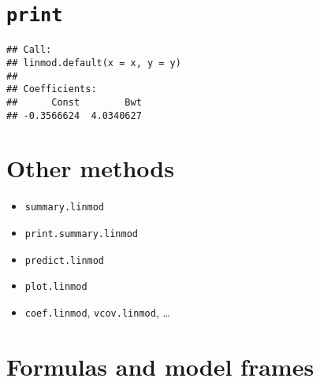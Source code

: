 \documentclass[]{book}
\newenvironment{Shaded}{\begin{snugshade}}{\end{snugshade}}
\newcommand{\KeywordTok}[1]{\textcolor[rgb]{0.13,0.29,0.53}{\textbf{{#1}}}}
\newcommand{\DataTypeTok}[1]{\textcolor[rgb]{0.13,0.29,0.53}{{#1}}}
\newcommand{\DecValTok}[1]{\textcolor[rgb]{0.00,0.00,0.81}{{#1}}}
\newcommand{\CharTok}[1]{\textcolor[rgb]{0.31,0.60,0.02}{{#1}}}
\newcommand{\StringTok}[1]{\textcolor[rgb]{0.31,0.60,0.02}{{#1}}}
\newcommand{\NormalTok}[1]{{#1}}
\theoremstyle{definition}
\theoremstyle{definition}
\theoremstyle{definition}
\theoremstyle{remark}
\begin{document}
\begin{Shaded}
\end{Shaded}

\section{\texorpdfstring{\texttt{print}}{print}}\label{print-1}

\begin{Shaded}
\end{Shaded}

\begin{verbatim}
## Call:
## linmod.default(x = x, y = y)
## 
## Coefficients:
##      Const        Bwt 
## -0.3566624  4.0340627
\end{verbatim}

\section{Other methods}\label{other-methods}

\begin{itemize}
\item
  \texttt{summary.linmod}
\item
  \texttt{print.summary.linmod}
\item
  \texttt{predict.linmod}
\item
  \texttt{plot.linmod}
\item
  \texttt{coef.linmod}, \texttt{vcov.linmod}, \ldots{}
\end{itemize}

\section{Formulas and model frames}\label{formulas-and-model-frames}
\end{document}
